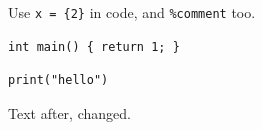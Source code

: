 \documentclass{article}
\begin{document}
Use \verb|x = {2}| in code, and \verb+%comment+ too.
\begin{verbatim}
int main() { return 1; }
\end{verbatim}
\begin{lstlisting}
print("hello")
\end{lstlisting}
Text after, changed.
\end{document}
